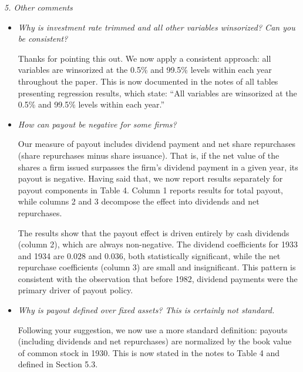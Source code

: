 \noindent \textit{\textcolor{red!60!black}{
5. Other comments\\
}}

\begin{itemize}
    \item[\textit{\textcolor{red!60!black}{a.}}] \textit{\textcolor{red!60!black}{
    Why is investment rate trimmed and all other variables winsorized? Can you be consistent?
    }}

    \bigskip

    \noindent Thanks for pointing this out. We now apply a consistent approach: all variables are winsorized at the 0.5\% and 99.5\% levels within each year throughout the paper. This is now documented in the notes of all tables presenting regression results, which state: ``All variables are winsorized at the 0.5\% and 99.5\% levels within each year.'' 
    
    \item[\textit{\textcolor{red!60!black}{b.}}] \textit{\textcolor{red!60!black}{
    How can payout be negative for some firms?
    }}

    \bigskip

    \noindent Our measure of payout includes dividend payment and net share repurchases (share repurchases minus share issuance). That is, if the net value of the shares a firm issued surpasses the firm's dividend payment in a given year, its payout is negative. Having said that, we now report results separately for payout components in Table 4. Column 1 reports results for total payout, while columns 2 and 3 decompose the effect into dividends and net repurchases. 
    
    The results show that the payout effect is driven entirely by cash dividends (column 2), which are always non-negative. The dividend coefficients for 1933 and 1934 are $0.028$ and $0.036$, both statistically significant, while the net repurchase coefficients (column 3) are small and insignificant. This pattern is consistent with the observation that before 1982, dividend payments were the primary driver of payout policy.
    
    
    \item[\textit{\textcolor{red!60!black}{c.}}] \textit{\textcolor{red!60!black}{
    Why is payout defined over fixed assets? This is certainly not standard.
    }}

    \bigskip

    \noindent Following your suggestion, we now use a more standard definition: payouts (including dividends and net repurchases) are normalized by the book value of common stock in 1930. This is now stated in the notes to Table 4 and defined in Section 5.3. 
    

\end{itemize}
